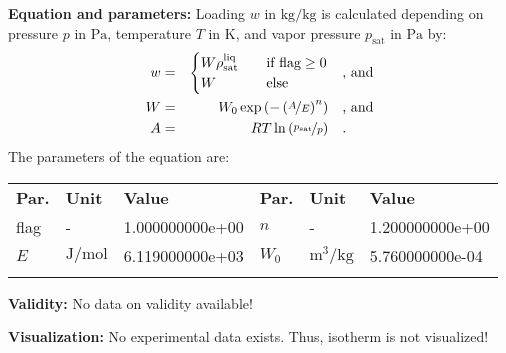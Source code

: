 \textbf{Equation and parameters:}
\newline
%
Loading $w$ in $\si{\kilogram\per\kilogram}$ is calculated depending on pressure $p$ in $\si{\pascal}$, temperature $T$ in $\si{\kelvin}$, and vapor pressure $p_\mathrm{sat}$ in $\si{\pascal}$ by:
%
\begin{equation*}
\begin{split}
w &=& \begin{cases} W \rho_\mathrm{sat}^{\mathrm{liq}} & \quad \text{if flag} \geq 0 \\ W & \quad \text{else} \end{cases} & \quad\text{, and} \\
W &=& W_0 \exp \left( - \left( \nicefrac{A}{E} \right) ^{n} \right) & \quad\text{, and} \\
A &=& R T \ln \left( \nicefrac{p_\mathrm{sat}}{p} \right) & \quad\text{.} \\
\end{split}
\end{equation*}
%
The parameters of the equation are:
%
\begin{longtable}[l]{lll|lll}
\toprule
\addlinespace
\textbf{Par.} & \textbf{Unit} & \textbf{Value} &	\textbf{Par.} & \textbf{Unit} & \textbf{Value} \\
\addlinespace
\midrule
\endhead

\bottomrule
\endfoot
\bottomrule
\endlastfoot
\addlinespace

flag & - & 1.000000000e+00 & $n$ & - & 1.200000000e+00 \\
$E$ & $\si{\joule\per\mole}$ & 6.119000000e+03 & $W_0$ & $\si{\cubic\meter\per\kilogram}$ & 5.760000000e-04 \\

\addlinespace\end{longtable}

\textbf{Validity:}
\newline
No data on validity available!
\newline

\textbf{Visualization:}
%
\newline
No experimental data exists. Thus, isotherm is not visualized!
%

\FloatBarrier
\newpage
